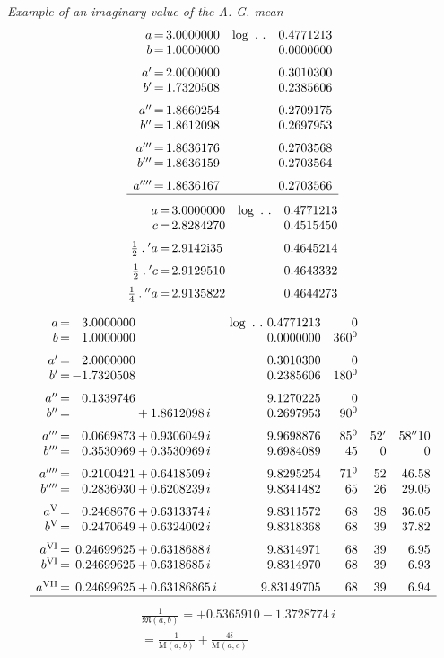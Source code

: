 \par \textit{Example of an imaginary value of the A. G. mean}
\[
\begin{array}[t]{r@{\,=\,}r l r}
a&3.0000000&\log\ .\ .&0.4771213\\
b&1.0000000&&0.0000000\\[6pt]
a'&2.0000000&&0.3010300\\
b'&1.7320508&&0.2385606\\[6pt]
a''&1.8660254&&0.2709175\\
b''&1.8612098&&0.2697953\\[6pt]
a'''&1.8636176&&0.2703568\\
b'''&1.8636159&&0.2703564\\[6pt]
a''''&1.8636167&&0.2703566\\\hline
\end{array}
\]
\[
\begin{array}[t]{r@{\,=\,}l l r}
a&3.0000000&\log\ .\ .&0.4771213\\
c&2.8284270&&0.4515450\\[6pt]
\frac12\mathbin{.}{}'a&2.9142\mathrm{i}35&&0.4645214\\[6pt]
\frac12\mathbin{.}{}'c&2.9129510&&0.4643332\\[6pt]
\frac14\mathbin{.}{}''a&2.9135822&&0.4644273\\[4pt]\hline
\end{array}
\]
\begingroup\small\setlength{\arraycolsep}{2pt}
\[
\begin{array}{r@{\,=\,}r@{}l r r r r}
a&3.0000000&&\log\ .\ .\ 0.4771213&0&&\\
b&1.0000000&&0.0000000&360^{0}&&\\[6pt]
a'&2.0000000&&0.3010300&0&&\\
b'&-1.7320508&&0.2385606&180^{0}&&\\[6pt]
a''&0.1339746&&9.1270225&0&&\\
b''&&{}+1.8612098\,i&0.2697953&90^{0}&&\\[6pt]
a'''&0.0669873&{}+0.9306049\,i&9.9698876&85^{0}&52'&58''10\\
b'''&0.3530969&{}+0.3530969\,i&9.6984089&45&0&0\\[6pt]
a''''&0.2100421&{}+0.6418509\,i&9.8295254&71^{0}&52&46.58\\
b''''&0.2836930&{}+0.6208239\,i&9.8341482&65&26&29.05\\[6pt]
a^{\mathrm{V}}&0.2468676&{}+0.6313374\,i&9.8311572&68&38&36.05\\
b^{\mathrm{V}}&0.2470649&{}+0.6324002\,i&9.8318368&68&39&37.82\\[6pt]
a^{\mathrm{VI}}&0.24699625&{}+0.6318688\,i&9.8314971&68&39&6.95\\
b^{\mathrm{VI}}&0.24699625&{}+0.6318685\,i&9.8314970&68&39&6.93\\[6pt]
a^{\mathrm{VII}}&0.24699625&{}+0.63186865\,i&9.83149705&68&39&6.94\\\hline
\end{array}
\]
\endgroup
{}
\[
\begin{aligned}&\frac{1}{\mathfrak{M}(a,b)}=+0.5365910-1.3728774\,i\\&=\frac{1}{\mathrm{M}(a,b)}+\frac{4i}{\mathrm{M}(a,c)}\end{aligned}
\]
\clearpage
\endgroup
